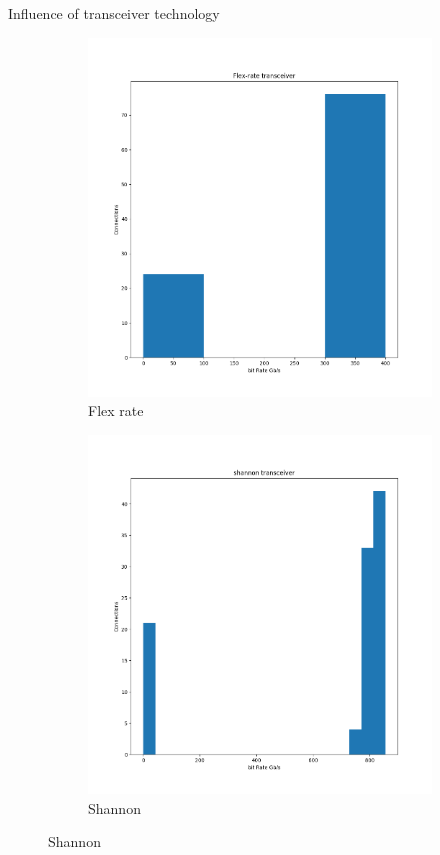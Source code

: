 \documentclass{beamer}
\begin{document}
\begin{frame}{Influence of transceiver technology}
\begin{figure}[h]
\begin{subfigure}{0.31\textwidth}
				\includegraphics[width=\linewidth]{Pictures/Flex rate cons.png}
				\caption{Flex rate}
			\end{subfigure}
			\hspace*{\fill}
			\begin{subfigure}{0.31\textwidth}
				\includegraphics[width=\linewidth]{Pictures/shannon cons.png}
				\caption{Shannon}
			\end{subfigure}
		\end{figure}
	\end{frame}
\end{document}
